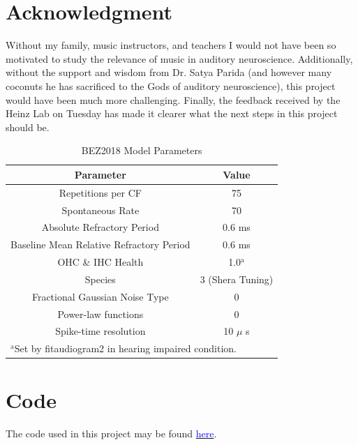 \documentclass[conference]{IEEEtran}
\begin{document}
\newpage

\section*{Acknowledgment}

Without my family, music instructors, and teachers I would not have been so motivated to study the relevance of music in auditory neuroscience. Additionally, without the support and wisdom from Dr. Satya Parida (and however many coconuts he has sacrificed to the Gods of auditory neuroscience), this project would have been much more challenging. Finally, the feedback received by the Heinz Lab on Tuesday has made it clearer what the next steps in this project should be.

\begin{table}[htbp]
\caption{BEZ2018 Model Parameters}
\begin{center}
\begin{tabular}{|c|c|}
\hline
\textbf{Parameter}&{\textbf{Value}} \\
\hline
\hline
Repetitions per CF & 75\\
\hline
Spontaneous Rate & 70\\
\hline
Absolute Refractory Period & 0.6 ms \\ 
\hline
Baseline Mean Relative Refractory Period & 0.6 ms\\
\hline
OHC \& IHC Health & 1.0$^{\mathrm{a}}$\\
\hline
Species & 3 (Shera Tuning)\\
\hline
Fractional Gaussian Noise Type & 0\\
\hline
Power-law functions & 0\\
\hline
Spike-time resolution & 10 $\mu$ s\\
\hline
\multicolumn{2}{l}{$^{\mathrm{a}}$Set by fitaudiogram2 in hearing impaired condition.}
\end{tabular}
\label{tab1}
\end{center}
\end{table}




\section*{Code}
The code used in this project may be found \href{https://github.com/sivaprakasaman/BME_511_FinalProject}{\textcolor{blue}{here}}.







% 

{}
\end{document}
